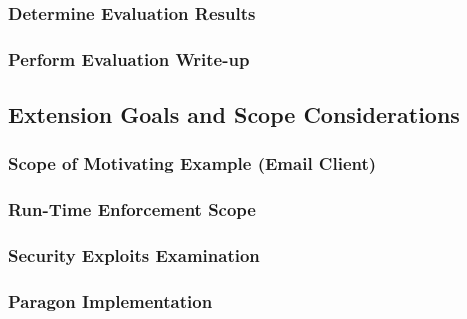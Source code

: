 \subsubsection{Determine Evaluation Results}

\subsubsection{Perform Evaluation Write-up}

\subsection{Extension Goals and Scope Considerations}
	
	\subsubsection{Scope of Motivating Example (Email Client)}
	
	\subsubsection{Run-Time Enforcement Scope}
	
	\subsubsection{Security Exploits Examination}
	
	\subsubsection{Paragon Implementation}
